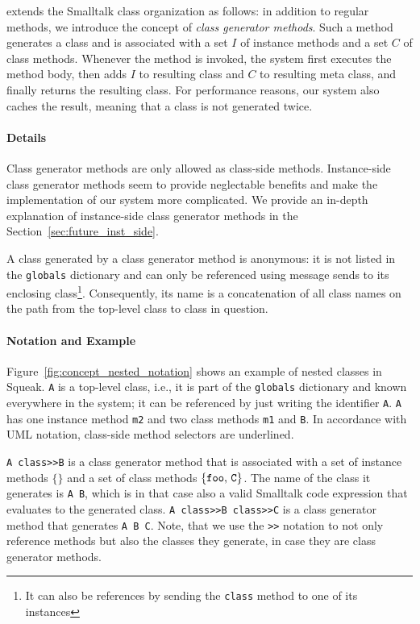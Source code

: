 \msname extends the Smalltalk class organization as follows: in addition to regular methods, we introduce the concept of \emph{class generator methods}. Such a method generates a class and is associated with a set $I$ of instance methods and a set $C$ of class methods. Whenever the method is invoked, the system first executes the method body, then adds $I$ to resulting class and $C$ to resulting meta class, and finally returns the resulting class. For performance reasons, our system also caches the result, meaning that a class is not generated twice.

\paragraph{Details}
Class generator methods are only allowed as class-side methods. Instance-side class generator methods seem to provide neglectable benefits and make the implementation of our system more complicated. We provide an in-depth explanation of instance-side class generator methods in the Section~\ref{sec:future_inst_side}.

A class generated by a class generator method is anonymous: it is not listed in the \texttt{globals} dictionary and can only be referenced using message sends to its enclosing class\footnote{It can also be references by sending the \texttt{class} method to one of its instances}. Consequently, its name is a concatenation of all class names on the path from the top-level class to class in question.


\paragraph{Notation and Example}
Figure~\ref{fig:concept_nested_notation} shows an example of nested classes in Squeak. \texttt{A} is a top-level class, i.e., it is part of the \texttt{globals} dictionary and known everywhere in the system; it can be referenced by just writing the identifier \texttt{A}. \texttt{A} has one instance method \texttt{m2} and two class methods \texttt{m1} and \texttt{B}. In accordance with UML notation, class-side method selectors are underlined. 

\texttt{A class>>B} is a class generator method that is associated with a set of instance methods $\{\}$ and a set of class methods $\{\mbox{\texttt{foo}, \texttt{C}}\}$. The name of the class it generates is \texttt{A B}, which is in that case also a valid Smalltalk code expression that evaluates to the generated class. \texttt{A class>>B class>>C} is a class generator method that generates \texttt{A B C}. Note, that we use the \texttt{>>} notation to not only reference methods but also the classes they generate, in case they are class generator methods.

